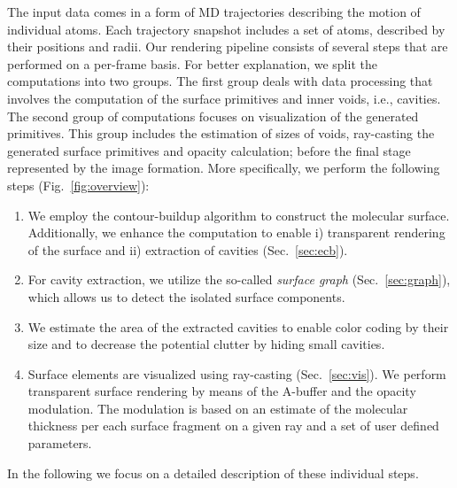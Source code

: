 The input data comes in a form of MD trajectories describing the motion of individual atoms. 
Each trajectory snapshot includes a set of atoms, described by their positions and radii. 
Our rendering pipeline consists of several steps that are performed on a per-frame basis. 
For better explanation, we split the computations into two groups. 
The first group deals with data processing that involves the computation of the surface primitives and inner voids, i.e., cavities.
The second group of computations focuses on visualization of the generated primitives. 
This group includes the estimation of sizes of voids, ray-casting the generated surface primitives and opacity calculation; before the final stage represented by the image formation. More specifically, we perform the following steps (Fig.~\ref{fig:overview}):
	\begin{enumerate}
	  \item We employ the contour-buildup algorithm to construct the molecular surface. Additionally, we enhance the computation to enable i) transparent rendering of the surface and ii) extraction of cavities (Sec.~\ref{sec:ecb}).
		\item For cavity extraction, we utilize the so-called \textit{surface graph} (Sec.~\ref{sec:graph}), which allows us to detect the isolated surface components.
		\item We estimate the area of the extracted cavities to enable color coding by their size and to decrease the potential clutter by hiding small cavities.
		\item Surface elements are visualized using ray-casting (Sec.~\ref{sec:vis}). We perform transparent surface rendering by means of the A-buffer and the opacity modulation. The modulation is based on an estimate of the molecular thickness per each surface fragment on a given ray and a set of user defined parameters.
	\end{enumerate}
	
In the following we focus on a detailed description of these individual steps.